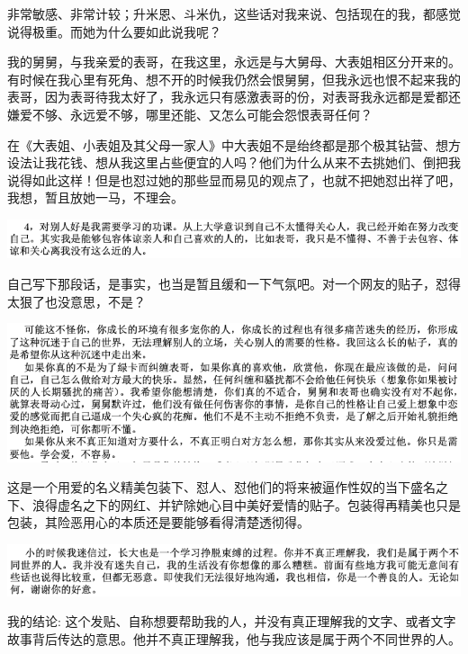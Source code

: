 \documentclass[9pt, b5paper]{article}
\begin{document}
非常敏感、非常计较；升米恩、斗米仇，这些话对我来说、包括现在的我，都感觉说得极重。而她为什么要如此说我呢？

我的舅舅，与我亲爱的表哥，在我这里，永远是与大舅母、大表姐相区分开来的。有时候在我心里有死角、想不开的时候我仍然会恨舅舅，但我永远也恨不起来我的表哥，因为表哥待我太好了，我永远只有感激表哥的份，对表哥我永远都是爱都还嫌爱不够、永远爱不够，哪里还能、又怎么可能会怨恨表哥任何？

在《大表姐、小表姐及其父母一家人》中大表姐不是绐终都是那个极其钻营、想方设法让我花钱、想从我这里占些便宜的人吗？他们为什么从来不去挑她们、倒把我说得如此这样！但是也怼过她的那些显而易见的观点了，也就不把她怼出祥了吧，我想，暂且放她一马，不理会。 

\begin{center}
\includegraphics[width=.9\linewidth]{./pic/p1p114-6.png}
\end{center}

自己写下那段话，是事实，也当是暂且缓和一下气氛吧。对一个网友的贴子，怼得太狠了也没意思，不是？

\begin{center}
\includegraphics[width=.9\linewidth]{./pic/p1p110-3.png}
\end{center}

这是一个用爱的名义精美包装下、怼人、怼他们的将来被逼作性奴的当下盛名之下、浪得虚名之下的网红、并铲除她心目中美好爱情的贴子。包装得再精美也只是包装，其险恶用心的本质还是要能够看得清楚透彻得。 

\begin{center}
\includegraphics[width=.9\linewidth]{./pic/p1p115-2.png}
\end{center}

我的结论: 这个发贴、自称想要帮助我的人，并没有真正理解我的文字、或者文字故事背后传达的意思。他并不真正理解我，他与我应该是属于两个不同世界的人。
\end{document}
